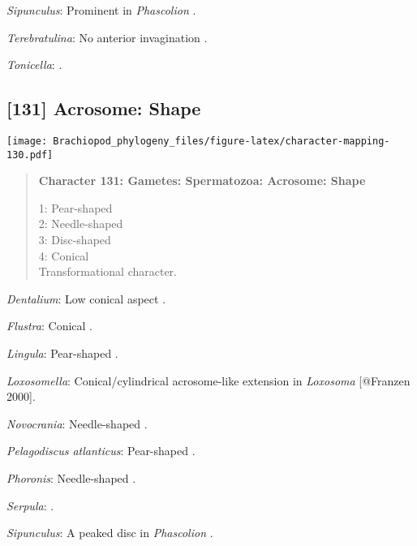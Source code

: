 \documentclass[openany]{book}
\theoremstyle{definition}
\theoremstyle{definition}
\theoremstyle{definition}
\theoremstyle{remark}
\begin{document}
\hypertarget{Sipunculus-coding-130}{}
\emph{Sipunculus}: Prominent in \emph{Phascolion} \citep{Rice1993}.

\hypertarget{Terebratulina-coding-130}{}
\emph{Terebratulina}: No anterior invagination
\citep{Hodgson1994Ultrastructureof}.

\hypertarget{Tonicella-coding-130}{}
\emph{Tonicella}: \citet{BucklandNicks1988}.

\subsection*{{[}131{]} Acrosome: Shape}\label{acrosome-shape}

\texttt{[image: Brachiopod\_phylogeny\_files/figure-latex/character-mapping-130.pdf]}

\begin{quote}
\textbf{Character 131: Gametes: Spermatozoa: Acrosome: Shape}

1: Pear-shaped\\
2: Needle-shaped\\
3: Disc-shaped\\
4: Conical\\
Transformational character.
\end{quote}

\hypertarget{Dentalium-coding-131}{}
\emph{Dentalium}: Low conical aspect \citep{DufresneDube1983}.

\hypertarget{Flustra-coding-131}{}
\emph{Flustra}: Conical \citep[in \emph{Tubulipora};][]{Franzen1984}.

\hypertarget{Lingula-coding-131}{}
\emph{Lingula}: Pear-shaped \citep{Fukumoto2003Theacrosome}.

\hypertarget{Loxosomella-coding-131}{}
\emph{Loxosomella}: Conical/cylindrical acrosome-like extension in
\emph{Loxosoma} {[}@Franzen 2000{]}.

\hypertarget{Novocrania-coding-131}{}
\emph{Novocrania}: Needle-shaped \citep{Afzelius1978Finestructure}.

\hypertarget{Pelagodiscus_atlanticus-coding-131}{}
\emph{Pelagodiscus atlanticus}: Pear-shaped
\citep{Hodgson1994Ultrastructureof}.

\hypertarget{Phoronis-coding-131}{}
\emph{Phoronis}: Needle-shaped \citep{Reunov2004Ultrastructuralstudy}.

\hypertarget{Serpula-coding-131}{}
\emph{Serpula}: \citet{Gherardi2011}.

\hypertarget{Sipunculus-coding-131}{}
\emph{Sipunculus}: A peaked disc in \emph{Phascolion} \citep{Rice1993}.
\end{document}
